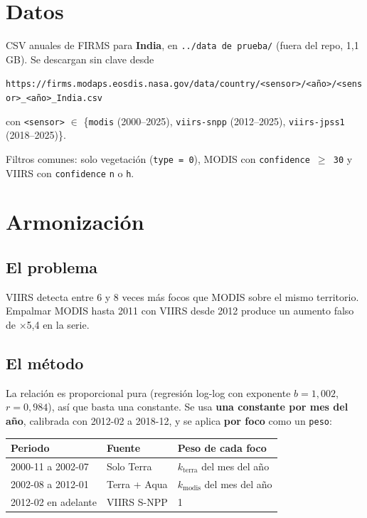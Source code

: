 \documentclass[11pt,a4paper]{article}
\begin{document}
\section{Datos}

CSV anuales de FIRMS para \textbf{India}, en \texttt{../data de prueba/} (fuera del repo,
1{,}1\,GB). Se descargan sin clave desde
\begin{center}
\footnotesize\texttt{https://firms.modaps.eosdis.nasa.gov/data/country/<sensor>/<año>/<sensor>\_<año>\_India.csv}
\end{center}
con \texttt{<sensor>} $\in$ \{\texttt{modis} (2000--2025), \texttt{viirs-snpp} (2012--2025),
\texttt{viirs-jpss1} (2018--2025)\}.

Filtros comunes: solo vegetación (\texttt{type = 0}), MODIS con \texttt{confidence $\geq$ 30}
y VIIRS con \texttt{confidence} \texttt{n} o \texttt{h}.

\section{Armonización}

\subsection*{El problema}
VIIRS detecta entre 6 y 8 veces más focos que MODIS sobre el mismo territorio. Empalmar
MODIS hasta 2011 con VIIRS desde 2012 produce un aumento falso de $\times$5{,}4 en la serie.

\subsection*{El método}
La relación es proporcional pura (regresión log-log con exponente $b = 1{,}002$, $r = 0{,}984$),
así que basta una constante. Se usa \textbf{una constante por mes del año}, calibrada con
2012-02 a 2018-12, y se aplica \textbf{por foco} como un \texttt{peso}:

\begin{tabularx}{\linewidth}{@{}llX@{}}
\toprule
Periodo & Fuente & Peso de cada foco \\
\midrule
2000-11 a 2002-07 & Solo Terra & $k_{\mathrm{terra}}$ del mes del año \\
2002-08 a 2012-01 & Terra + Aqua & $k_{\mathrm{modis}}$ del mes del año \\
2012-02 en adelante & VIIRS S-NPP & 1 \\
\bottomrule
\end{tabularx}
\end{document}
